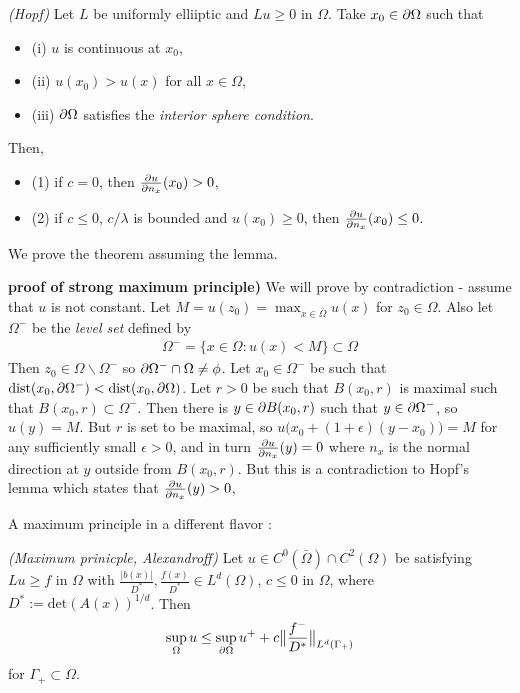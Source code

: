 \documentclass[12pt,a4paper]{article}
\newenvironment{proof}
{\begin{changemargin}{1cm}{0.5cm} 
	}%
	{\end{changemargin}
}
\renewenvironment{i}
{\begin{itemize} 
	}%
	{\end{itemize}
}
\newenvironment{p}
{\begin{proof} 
	}%
	{\end{proof}
}
\begin{document}
\lem \emph{(Hopf)} Let $L$ be uniformly elliiptic and $Lu \geq 0$ in $\Omega$. Take $x_0 \in \partial\Omega$ such that
\begin{i}
\item[(i)] $u$ is continuous at $x_0$,
\item[(ii)] $u(x_0) > u(x)$ for all $x\in \Omega$,
\item[(iii)] $\partial \Omega$ satisfies the \emph{interior sphere condition}.
\end{i}
Then,
\begin{i}
\item[(1)] if $c=0$, then $\frac{\partial u}{\partial n_x} (x_0) >0$,
\item[(2)] if $c\leq 0$, $c/\lambda$ is bounded and $u(x_0) \geq 0$, then $\frac{\partial u}{\partial n_x}(x_0) \leq 0$.
\end{i}
\s

We prove the theorem assuming the lemma.
\s

\begin{p}
\textbf{proof of strong maximum principle)} We will prove by contradiction - assume that $u$ is not constant. Let $M = u(z_0) = \max_{x\in \bar{\Omega}}u(x)$ for $z_0 \in \Omega$. Also let $\Omega^-$ be the \emph{level set} defined by
\begin{align*}
\Omega^- = \{x\in \Omega : u(x) < M  \} \subset \Omega 
\end{align*}
Then $z_0 \in \Omega \backslash \Omega^-$ so $\partial \Omega^- \cap \Omega \neq \phi$. Let $x_0 \in \Omega^-$ be such that $\text{dist}(x_0, \partial \Omega^-) < \text{dist} (x_0, \partial \Omega)$. Let $r>0$ be such that $B(x_0, r)$ is maximal such that $B(x_0, r)\subset \Omega^-$. Then there is $y\in \partial B(x_0, r)$ such that $y\in \partial \Omega^-$, so $u(y) = M$. But $r$ is set to be maximal, so $u\big(x_0 + (1+\epsilon)(y-x_0)\big) =M$ for any sufficiently small $\epsilon >0$, and in turn $\frac{\partial u}{\partial n_x}(y) =0$ where $n_x$ is the normal direction at $y$ outside from $B(x_0, r)$. But this is a contradiction to Hopf's lemma which states that $\frac{\partial u}{\partial n_x}(y)>0$,

\eop
\end{p}
\s

A maximum principle in a different flavor :
\s

\thm \emph{(Maximum prinicple, Alexandroff)} Let $u \in C^0(\bar{\Omega}) \cap C^2(\Omega)$ be satisfying $Lu \geq f$ in $\Omega$ with $\frac{|b(x)|}{D^*}, \frac{f(x)}{D^*} \in L^d(\Omega)$, $c\leq  0$ in $\Omega$, where $D^* := \text{det}(A(x))^{1/d}$. Then
\begin{align*}
\sup_{\Omega} u \leq \sup_{\partial \Omega} u^+  + c \bigl\lVert\frac{f^-}{D^*}\bigr\rVert_{L^d(\Gamma_+)}
\end{align*}
for $\Gamma_+ \subset \Omega$.
\s
\end{document}
